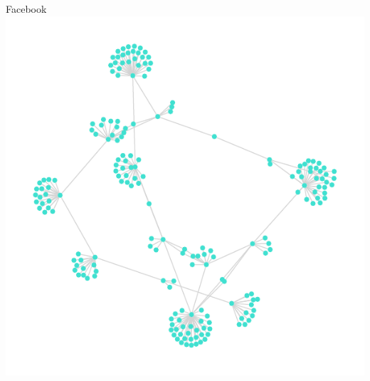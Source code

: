 \documentclass{beamer}
\begin{document}
\begin{frame}
\begin{columns}
\begin{column}[t]{0.5\textwidth}
\begin{block}{Facebook}
        \includegraphics[scale=0.3]{fig/facebook_ff}
      \end{block}
    \end{column}
  \end{columns}
\end{frame}



\end{document}
